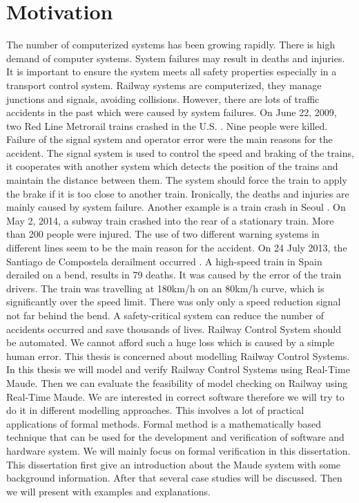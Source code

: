 \documentclass[a4paper,11pt]{report}
\begin{document}
\section{Motivation}
The number of computerized systems has been growing rapidly. There is high demand of computer systems. System failures may result in deaths and injuries. It is important to ensure the system meets all safety properties especially in a transport control system. Railway systems are computerized, they manage junctions and signals, avoiding collisions. However, there are lots of traffic accidents in the past which were caused by system failures. On June 22, 2009, two Red Line Metrorail trains crashed in the U.S. \cite{washington}. Nine people were killed. Failure of the signal system and operator error were the main reasons for the accident. The signal system is used to control the speed and braking of the trains, it cooperates with another system which detects the position of the trains and maintain the distance between them. The system should force the train to apply the brake if it is too close to another train. Ironically, the deaths  and injuries are mainly caused by system failure. Another example is a train crash in Seoul \cite{seoul}. On May 2, 2014, a subway train crashed into the rear of a stationary train. More than 200 people were injured. The use of two different warning systems in different lines seem to be the main reason for the accident. On 24 July 2013, the Santiago de Compostela derailment occurred \cite{santiago}. A high-speed train in Spain derailed on a bend, results in 79 deaths. It was caused by the error of the train drivers. The train was travelling at 180km/h on an 80km/h curve, which is significantly over the speed limit. There was only only a speed reduction signal not far behind the bend. A safety-critical system can reduce the number of accidents occurred and save thousands of lives. Railway Control System should be automated. We cannot afford such a huge loss which is caused by a simple human error. \newline \newline
This thesis is concerned about modelling Railway Control Systems. In this thesis we will model and verify Railway Control Systems using Real-Time Maude. Then we can evaluate the feasibility of model checking on Railway using Real-Time Maude. We are interested in correct software therefore we will try to do it in different modelling approaches. This involves a lot of practical applications of formal methods. Formal method is a mathematically based technique that can be used for the development and verification of software and hardware system. We will mainly focus on formal verification in this dissertation. This dissertation first give an introduction about the Maude system with some background information. After that several case studies will be discussed. Then we will present with examples and explanations. 
\end{document}
